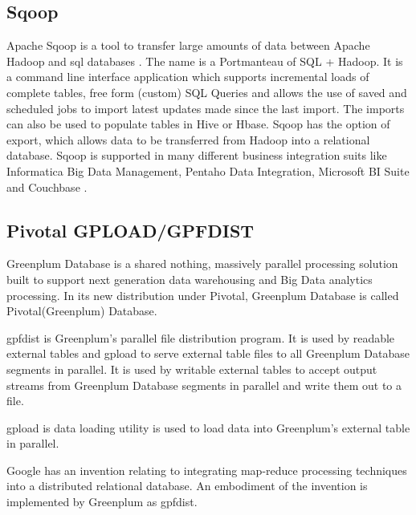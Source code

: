\subsection{Sqoop}
     
     Apache Sqoop is a tool to transfer large amounts of data between
     Apache Hadoop and sql databases \cite{www-sqoop}. The name is a
     Portmanteau of SQL + Hadoop. It is a command line interface
     application which supports incremental loads of complete tables,
     free form (custom) SQL Queries and allows the use of saved and
     scheduled jobs to import latest updates made since the last
     import. The imports can also be used to populate tables in Hive
     or Hbase. Sqoop has the option of export, which allows data to be
     transferred from Hadoop into a relational database. Sqoop is
     supported in many different business integration suits like
     Informatica Big Data Management, Pentaho Data Integration,
     Microsoft BI Suite and Couchbase \cite{sqoop-wiki}.

\subsection{Pivotal GPLOAD/GPFDIST}

     Greenplum Database \cite{book-greenplum-gollapudi2013} is a
     shared nothing, massively parallel processing solution built to
     support next generation data warehousing and Big Data analytics
     processing. In its new distribution under Pivotal, Greenplum
     Database is called Pivotal(Greenplum) Database.

     gpfdist \cite{www-gpfdist} is Greenplum's parallel file
     distribution program. It is used by readable external tables and
     gpload to serve external table files to all Greenplum Database
     segments in parallel. It is used by writable external tables to
     accept output streams from Greenplum Database segments in
     parallel and write them out to a file.

     gpload \cite{book-greenplum-gollapudi2013} is data loading
     utility is used to load data into Greenplum's external table in
     parallel.

     Google has an invention \cite{patent-google-gpf} relating to
     integrating map-reduce processing techniques into a distributed
     relational database. An embodiment of the invention is
     implemented by Greenplum as gpfdist.

